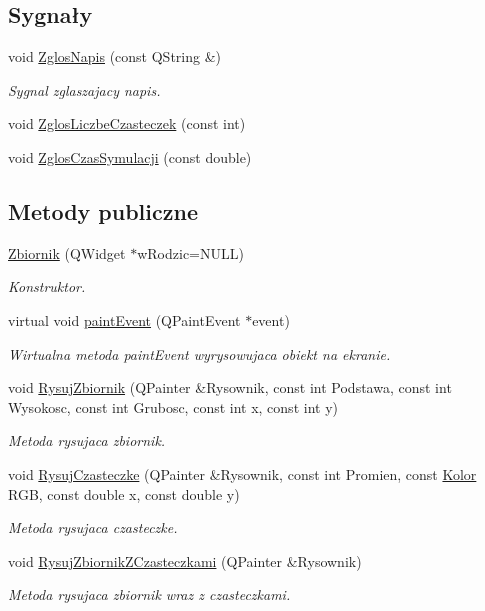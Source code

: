 \subsection*{Sygnały}
\begin{DoxyCompactItemize}
\item 
void \hyperlink{class_zbiornik_a2d92e4a46f9a5dda37ddd9948046580b}{Zglos\+Napis} (const Q\+String \&)
\begin{DoxyCompactList}\small\item\em Sygnal zglaszajacy napis. \end{DoxyCompactList}\item 
void \hyperlink{class_zbiornik_ad200a7e5bc038ad94131d1a354266889}{Zglos\+Liczbe\+Czasteczek} (const int)
\item 
void \hyperlink{class_zbiornik_a96b9ee7d80fc0f29787dc060027d2805}{Zglos\+Czas\+Symulacji} (const double)
\end{DoxyCompactItemize}
\subsection*{Metody publiczne}
\begin{DoxyCompactItemize}
\item 
\hyperlink{class_zbiornik_a52fb780bf924b89018348be8a65eaf68}{Zbiornik} (Q\+Widget $\ast$w\+Rodzic=N\+U\+L\+L)
\begin{DoxyCompactList}\small\item\em Konstruktor. \end{DoxyCompactList}\item 
virtual void \hyperlink{class_zbiornik_af7a9c185e95b92de342c6dc69f020765}{paint\+Event} (Q\+Paint\+Event $\ast$event)
\begin{DoxyCompactList}\small\item\em Wirtualna metoda paint\+Event wyrysowujaca obiekt na ekranie. \end{DoxyCompactList}\item 
void \hyperlink{class_zbiornik_ad15f40d418d9ebf261de0eabe8cc2906}{Rysuj\+Zbiornik} (Q\+Painter \&Rysownik, const int Podstawa, const int Wysokosc, const int Grubosc, const int x, const int y)
\begin{DoxyCompactList}\small\item\em Metoda rysujaca zbiornik. \end{DoxyCompactList}\item 
void \hyperlink{class_zbiornik_ad93223745351d4d18f64c5c43dfc5fdc}{Rysuj\+Czasteczke} (Q\+Painter \&Rysownik, const int Promien, const \hyperlink{class_kolor}{Kolor} R\+G\+B, const double x, const double y)
\begin{DoxyCompactList}\small\item\em Metoda rysujaca czasteczke. \end{DoxyCompactList}\item 
void \hyperlink{class_zbiornik_af831a2751191eab54fb6438392ac6edb}{Rysuj\+Zbiornik\+Z\+Czasteczkami} (Q\+Painter \&Rysownik)
\begin{DoxyCompactList}\small\item\em Metoda rysujaca zbiornik wraz z czasteczkami. \end{DoxyCompactList}\end{DoxyCompactItemize}
